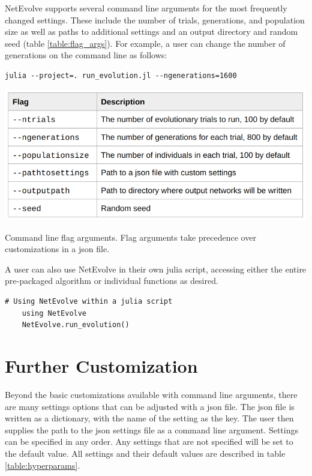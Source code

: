 \documentclass[12pt]{report}
\begin{document}
NetEvolve supports several command line arguments for the most frequently changed settings. These include the number of trials, generations, and population size as well as paths to additional settings and an output directory and random seed (table \ref{table:flag_args}). For example, a user can change the number of generations on the command line as follows:


\begin{Verbatim}[frame=single]
	julia --project=. run_evolution.jl --ngenerations=1600
\end{Verbatim}

\begin{table}
    \centering
    \includegraphics[width=15cm]{images/flag_args_table.png}
    \caption[Description of command line flag arguments]{Command line flag arguments. Flag arguments take precedence over customizations in a json file.}
    \label{table:flag_args}
\end{table}

A user can also use NetEvolve in their own julia script, accessing either the entire pre-packaged algorithm or individual functions as desired. 

\begin{Verbatim}[frame=single]
	# Using NetEvolve within a julia script
	using NetEvolve
	NetEvolve.run_evolution()
\end{Verbatim}

\section{Further Customization}
Beyond the basic customizations available with command line arguments, there are many settings options that can be adjusted with a json file. The json file is written as a dictionary, with the name of the setting as the key. The user then supplies the path to the json settings file as a command line argument. Settings can be specified in any order. Any settings that are not specified will be set to the default value. All settings and their default values are described in table \ref{table:hyperparams}.
\end{document}
